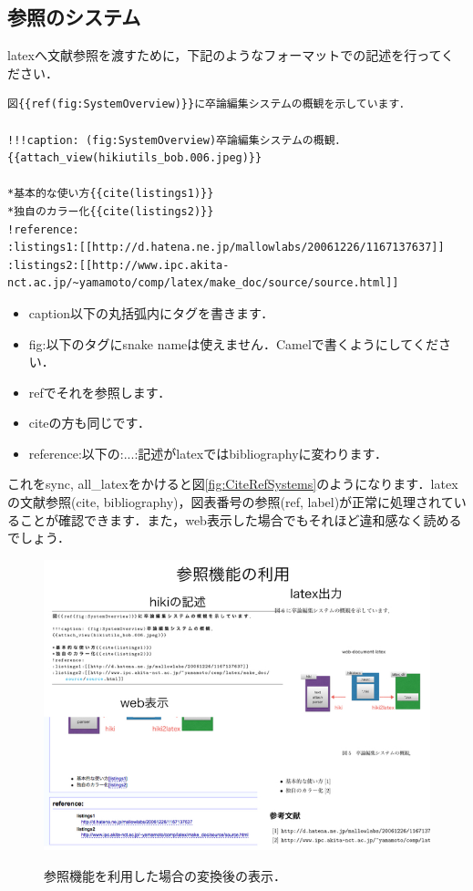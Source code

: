 \subsection{参照のシステム}
latexへ文献参照を渡すために，下記のようなフォーマットでの記述を行ってください．
\begin{lstlisting}[style=customCsh,basicstyle={\scriptsize\ttfamily}]
図{{ref(fig:SystemOverview)}}に卒論編集システムの概観を示しています．

!!!caption: (fig:SystemOverview)卒論編集システムの概観．
{{attach_view(hikiutils_bob.006.jpeg)}}

*基本的な使い方{{cite(listings1)}}
*独自のカラー化{{cite(listings2)}}
!reference:
:listings1:[[http://d.hatena.ne.jp/mallowlabs/20061226/1167137637]]
:listings2:[[http://www.ipc.akita-nct.ac.jp/~yamamoto/comp/latex/make_doc/source/source.html]]
\end{lstlisting}
\begin{itemize}
\item caption以下の丸括弧内にタグを書きます．
\item fig:以下のタグにsnake nameは使えません．Camelで書くようにしてください．
\item refでそれを参照します．
\item citeの方も同じです．
\item reference:以下の:...:記述がlatexではbibliographyに変わります．
\end{itemize}
これをsync, all\_latexをかけると図\ref{fig:CiteRefSystems}のようになります．latexの文献参照(cite, bibliography)，図表番号の参照(ref, label)が正常に処理されていることが確認できます．また，web表示した場合でもそれほど違和感なく読めるでしょう．

\begin{figure}[htbp]\begin{center}
\includegraphics[width=12cm,bb= 0 0 937 753]{../figs/./hikiutils_bob.007.jpeg}
\caption{参照機能を利用した場合の変換後の表示．}
\label{fig:CiteRefSystems}
\label{default}\end{center}\end{figure}
